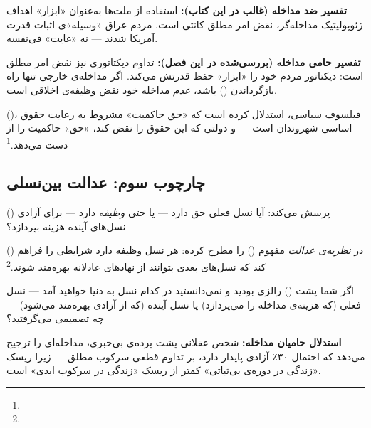 \begin{tcolorbox}[wavebox, title={استدلال کانتی: دو تفسیر متضاد}]
\textbf{تفسیر ضد مداخله (غالب در این کتاب):}
استفاده از ملت‌ها به‌عنوان «ابزار» اهداف ژئوپولیتیک مداخله‌گر، نقض امر مطلق کانتی است. مردم عراق «وسیله»ی اثبات قدرت آمریکا شدند — نه «غایت» فی‌نفسه.

\textbf{تفسیر حامی مداخله (بررسی‌شده در این فصل):}
تداوم دیکتاتوری نیز نقض امر مطلق است: دیکتاتور مردم خود را «ابزار» حفظ قدرتش می‌کند. اگر مداخله‌ی خارجی تنها راه بازگرداندن  () باشد، \textit{عدم} مداخله خود نقض وظیفه‌ی اخلاقی است.

 ()، فیلسوف سیاسی، استدلال کرده است که «حق حاکمیت» مشروط به رعایت حقوق اساسی شهروندان است — و دولتی که این حقوق را نقض کند، «حق» حاکمیت را از دست می‌دهد.\footnote{}
\end{tcolorbox}

\subsection{چارچوب سوم: عدالت بین‌نسلی}
\label{subsec:ch15-intergenerational}

 () پرسش می‌کند: آیا نسل فعلی حق دارد — یا حتی \textit{وظیفه} دارد — برای آزادی نسل‌های آینده هزینه بپردازد؟

 () در \textit{نظریه‌ی عدالت} مفهوم  () را مطرح کرده: هر نسل وظیفه دارد شرایطی را فراهم کند که نسل‌های بعدی بتوانند از نهادهای عادلانه بهره‌مند شوند.\footnote{}

\begin{tcolorbox}[defbox, title={پرسش رالزی: پرده‌ی بی‌خبری بین‌نسلی}]
اگر شما پشت  () رالزی بودید و نمی‌دانستید در کدام نسل به دنیا خواهید آمد — نسل فعلی (که هزینه‌ی مداخله را می‌پردازد) یا نسل آینده (که از آزادی بهره‌مند می‌شود) — چه تصمیمی می‌گرفتید؟

\textbf{استدلال حامیان مداخله:} شخص عقلانی پشت پرده‌ی بی‌خبری، مداخله‌ای را ترجیح می‌دهد که احتمال ۳۰٪ آزادی پایدار دارد، بر تداوم قطعی سرکوب مطلق — زیرا ریسک «زندگی در دوره‌ی بی‌ثباتی» کمتر از ریسک «زندگی در سرکوب ابدی» است.
\end{tcolorbox}

